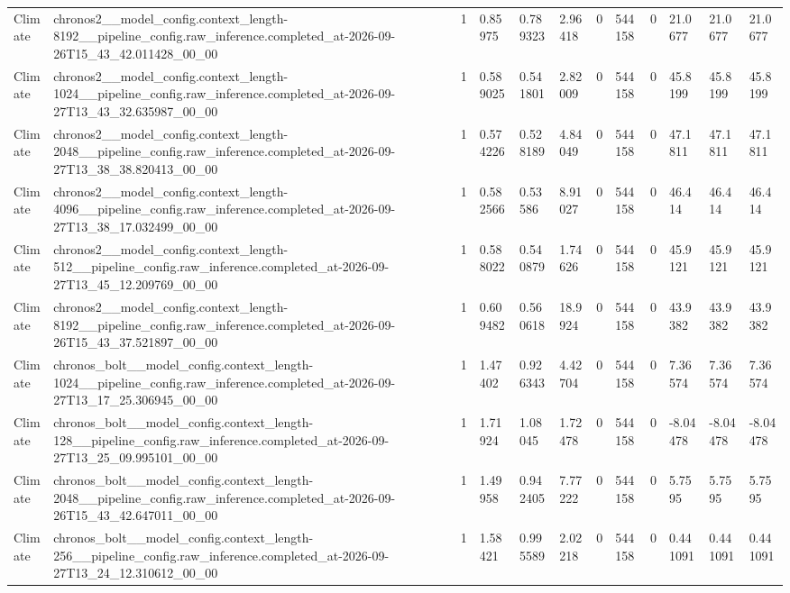 \begin{tabular}{llllllllllll}
Climate & chronos2\_\_model\_config.context\_length-8192\_\_pipeline\_config.raw\_inference.completed\_at-2026-09-26T15\_43\_42.011428\_00\_00 & 1 & 0.85975 & 0.789323 & 2.96418 & 0 & 544158 & 0 & 21.0677 & 21.0677 & 21.0677 \\
Climate & chronos2\_\_model\_config.context\_length-1024\_\_pipeline\_config.raw\_inference.completed\_at-2026-09-27T13\_43\_32.635987\_00\_00 & 1 & 0.589025 & 0.541801 & 2.82009 & 0 & 544158 & 0 & 45.8199 & 45.8199 & 45.8199 \\
Climate & chronos2\_\_model\_config.context\_length-2048\_\_pipeline\_config.raw\_inference.completed\_at-2026-09-27T13\_38\_38.820413\_00\_00 & 1 & 0.574226 & 0.528189 & 4.84049 & 0 & 544158 & 0 & 47.1811 & 47.1811 & 47.1811 \\
Climate & chronos2\_\_model\_config.context\_length-4096\_\_pipeline\_config.raw\_inference.completed\_at-2026-09-27T13\_38\_17.032499\_00\_00 & 1 & 0.582566 & 0.53586 & 8.91027 & 0 & 544158 & 0 & 46.414 & 46.414 & 46.414 \\
Climate & chronos2\_\_model\_config.context\_length-512\_\_pipeline\_config.raw\_inference.completed\_at-2026-09-27T13\_45\_12.209769\_00\_00 & 1 & 0.588022 & 0.540879 & 1.74626 & 0 & 544158 & 0 & 45.9121 & 45.9121 & 45.9121 \\
Climate & chronos2\_\_model\_config.context\_length-8192\_\_pipeline\_config.raw\_inference.completed\_at-2026-09-26T15\_43\_37.521897\_00\_00 & 1 & 0.609482 & 0.560618 & 18.9924 & 0 & 544158 & 0 & 43.9382 & 43.9382 & 43.9382 \\
Climate & chronos\_bolt\_\_model\_config.context\_length-1024\_\_pipeline\_config.raw\_inference.completed\_at-2026-09-27T13\_17\_25.306945\_00\_00 & 1 & 1.47402 & 0.926343 & 4.42704 & 0 & 544158 & 0 & 7.36574 & 7.36574 & 7.36574 \\
Climate & chronos\_bolt\_\_model\_config.context\_length-128\_\_pipeline\_config.raw\_inference.completed\_at-2026-09-27T13\_25\_09.995101\_00\_00 & 1 & 1.71924 & 1.08045 & 1.72478 & 0 & 544158 & 0 & -8.04478 & -8.04478 & -8.04478 \\
Climate & chronos\_bolt\_\_model\_config.context\_length-2048\_\_pipeline\_config.raw\_inference.completed\_at-2026-09-26T15\_43\_42.647011\_00\_00 & 1 & 1.49958 & 0.942405 & 7.77222 & 0 & 544158 & 0 & 5.7595 & 5.7595 & 5.7595 \\
Climate & chronos\_bolt\_\_model\_config.context\_length-256\_\_pipeline\_config.raw\_inference.completed\_at-2026-09-27T13\_24\_12.310612\_00\_00 & 1 & 1.58421 & 0.995589 & 2.02218 & 0 & 544158 & 0 & 0.441091 & 0.441091 & 0.441091 \\

\end{tabular}
